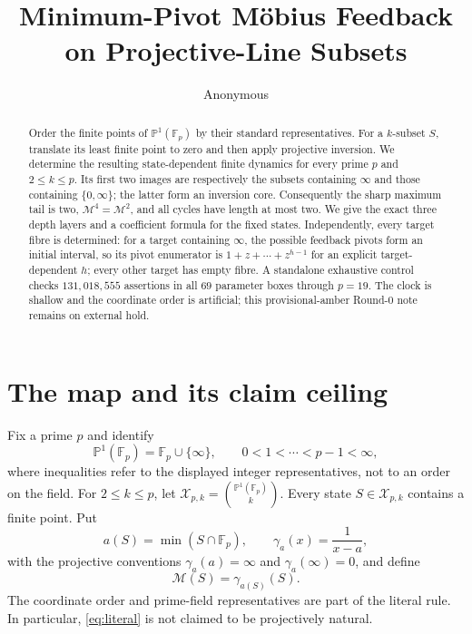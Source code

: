 \documentclass[a4paper,10pt]{amsart}
\title[Minimum-pivot M\"obius feedback]{Minimum-Pivot M\"obius Feedback on Projective-Line Subsets}
\author{Anonymous}
\date{}
\theoremstyle{remark}
\newcommand{\F}{\mathbb F}
\newcommand{\PP}{\mathbb P^1}
\newcommand{\X}{\mathcal X}
\newcommand{\M}{\mathcal M}
\begin{document}
\begin{abstract}
Order the finite points of $\PP(\F_p)$ by their standard representatives.
For a $k$-subset $S$, translate its least finite point to zero and then
apply projective inversion.  We determine the resulting state-dependent
finite dynamics for every prime $p$ and $2\leq k\leq p$.  Its first two
images are respectively the subsets containing $\infty$ and those containing
$\{0,\infty\}$; the latter form an inversion core.  Consequently the sharp
maximum tail is two, $\M^4=\M^2$, and all cycles have length at most two.
We give the exact three depth layers and a coefficient formula for the fixed
states.  Independently, every target fibre is determined: for a target
containing $\infty$, the possible feedback pivots form an initial interval,
so its pivot enumerator is $1+z+\cdots+z^{h-1}$ for an explicit
target-dependent $h$; every other target has empty fibre.  A standalone
exhaustive control checks $131{,}018{,}555$ assertions in all $69$ parameter
boxes through $p=19$.  The clock is shallow and the coordinate order is
artificial; this provisional-amber Round-0 note remains on external hold.
\end{abstract}

\maketitle

\section{The map and its claim ceiling}

Fix a prime $p$ and identify
\[
 \PP(\F_p)=\F_p\cup\{\infty\},
 \qquad 0<1<\cdots<p-1<\infty,
\]
where inequalities refer to the displayed integer representatives, not to
an order on the field.  For $2\leq k\leq p$, let
$\X_{p,k}=\binom{\PP(\F_p)}{k}$.  Every state $S\in\X_{p,k}$ contains a
finite point.  Put
\[
 a(S)=\min(S\cap\F_p),
 \qquad
 \gamma_a(x)=\frac{1}{x-a},
\]
with the projective conventions
$\gamma_a(a)=\infty$ and $\gamma_a(\infty)=0$, and define
\begin{equation}\label{eq:literal}
 \M(S)=\gamma_{a(S)}(S).
\end{equation}
The coordinate order and prime-field representatives are part of the
literal rule.  In particular, \eqref{eq:literal} is not claimed to be
projectively natural.
\end{document}
